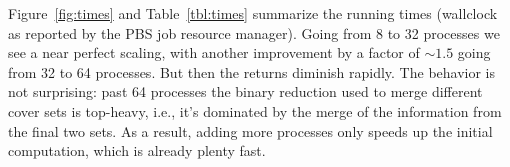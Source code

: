 Figure~\ref{fig:times} and Table~\ref{tbl:times} summarize the running times
(wallclock as reported by the PBS job resource manager).
Going from 8 to 32 processes we see a near
perfect scaling, with another improvement by a factor of $\sim 1.5$ going from
32 to 64 processes. But then the returns diminish rapidly. The behavior is not
surprising: past 64 processes the binary reduction used to merge
different cover sets is top-heavy, i.e., it's dominated by the merge of the
information from the final two sets. As a result, adding more processes only
speeds up the initial computation, which is already plenty fast.
%
%
%
%


